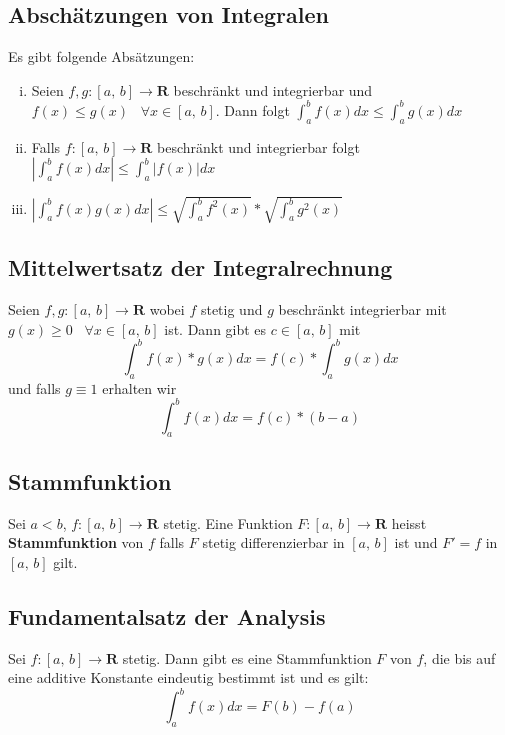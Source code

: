 \documentclass[8pt]{article}
\begin{document}
\begin{multicols*}{3}
\subsection{Abschätzungen von Integralen}

Es gibt folgende Absätzungen:
\begin{enumerate}[(i)]
  \item Seien $f, g: [a,\,b] \rightarrow \mathbf{R}$ beschränkt und integrierbar und $f(x) \leq g(x)\;\;\; \forall x \in [a,\,b]$. Dann folgt $\int_a^b f(x) dx \leq \int_a^b g(x) dx$
  \item Falls $f:[a,\,b] \rightarrow \mathbf{R}$ beschränkt und integrierbar folgt $|\int_a^b f(x) dx| \leq \int_a^b |f(x)| dx$
  \item $|\int_a^b f(x)g(x) dx| \leq \sqrt{\int_a^b f^2(x)} * \sqrt{\int_a^b g^2(x)}$
\end{enumerate}

\subsection{Mittelwertsatz der Integralrechnung}

Seien $f,g:[a,\,b] \rightarrow \mathbf{R}$ wobei $f$ stetig und $g$ beschränkt integrierbar mit $g(x) \geq 0 \;\;\; \forall x \in [a,\,b]$ ist.
Dann gibt es $c \in [a,\,b]$ mit $$\int_a^b f(x) * g(x) dx = f(c) * \int_a^b g(x) dx$$
und falls $g \equiv 1$ erhalten wir $$\int_a^b f(x) dx = f(c) * (b - a)$$

\subsection{Stammfunktion}

Sei $a < b$, $f:[a,\,b] \rightarrow \mathbf{R}$ stetig. Eine Funktion $F:[a,\,b] \rightarrow \mathbf{R}$ heisst
\textbf{Stammfunktion} von $f$ falls $F$ stetig differenzierbar in $[a,\, b]$ ist und $F' = f$ in $[a,\,b]$ gilt.

\subsection{Fundamentalsatz der Analysis}

Sei $f:[a,\,b] \rightarrow \mathbf{R}$ stetig. Dann gibt es eine Stammfunktion $F$ von $f$, die bis auf eine additive Konstante eindeutig bestimmt ist und es gilt:
$$\int_a^b f(x) dx = F(b) - f(a)$$


\end{multicols*}
\end{document}
